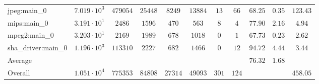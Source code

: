 \begin{tabular}{|l|c|c|c|c|c|c|c|c|c|c|}
jpeg:main\_0            & $ 7.019 \cdot 10^{3} $ & $ 479054 $ & $ 25448 $ & $ 8249  $ & $ 13884 $ & $ 13  $ & $ 66  $ & $ 68.25       $ & $ 0.35    $ & $ 123.43  $ \\
mips:main\_0            & $ 3.191 \cdot 10^{1} $ & $ 2486   $ & $ 1596  $ & $ 470   $ & $ 563   $ & $ 8   $ & $ 4   $ & $ 77.90       $ & $ 2.16    $ & $ 4.94    $ \\
mpeg2:main\_0           & $ 3.203 \cdot 10^{1} $ & $ 2169   $ & $ 1989  $ & $ 678   $ & $ 1018  $ & $ 0   $ & $ 1   $ & $ 67.73       $ & $ 0.23    $ & $ 2.62    $ \\
sha\_driver:main\_0     & $ 1.196 \cdot 10^{3} $ & $ 113310 $ & $ 2227  $ & $ 682   $ & $ 1466  $ & $ 0   $ & $ 12  $ & $ 94.72       $ & $ 4.44    $ & $ 3.44    $ \\
\hline
Average                 & $                    $ & $        $ & $       $ & $       $ & $       $ & $     $ & $     $ & $ 76.32       $ & $ 1.68    $ & $         $ \\
\hline
Overall                 & $ 1.051 \cdot 10^{4} $ & $ 775353 $ & $ 84808 $ & $ 27314 $ & $ 49093 $ & $ 301 $ & $ 124 $ & $             $ & $         $ & $ 458.05  $ \\
\hline
\end{tabular}
